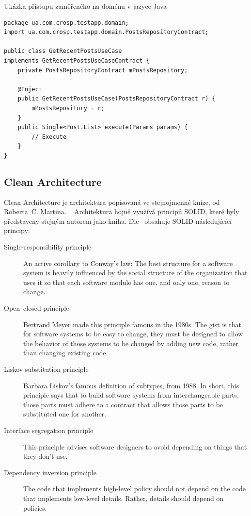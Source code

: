 \begin{listing}
    \caption{Ukázka přístupu zaměřeného na doménu v jazyce Java~\cite{architecture}}
    \label{code:architecture-domain}
    \begin{verbatim}
package ua.com.crosp.testapp.domain;
import ua.com.crosp.testapp.domain.PostsRepositoryContract;

public class GetRecentPostsUseCase
implements GetRecentPostsUseCaseContract {
    private PostsRepositoryContract mPostsRepository;

    @Inject
    public GetRecentPostsUseCase(PostsRepositoryContract r) {
        mPostsRepository = r;
    }
    public Single<Post.List> execute(Params params) {
        // Execute
    }
}
    \end{verbatim}
\end{listing}

\subsection{Clean Architecture}

Clean Architecture je architektura popisovaná ve stejnojmenné knize,
od Roberta~C. Martina.
\emph{}~\cite[strana~57]{martin_clean_architecture}
Architektura hojně využívá principů SOLID,
které byly představeny stejným autorem jako kniha.
Dle~\cite[strana~57--59]{martin_clean_architecture} obsahuje SOLID následujícící
principy:

\begin{description}
    \item[Single-responsibility principle] An active corollary to Conway’s law:
    The best structure for a software system is heavily influenced
    by the social structure of the organization that uses it so that
    each software module has one, and only one, reason to change.
    \item[Open--closed principle] Bertrand Meyer made this principle famous
    in the 1980s.
    The gist is that for software systems to be easy to change,
    they must be designed to allow the behavior of those systems to be changed
    by adding new code,
    rather than changing existing code.
    \item[Liskov substitution principle] Barbara Liskov’s famous definition of
    subtypes, from 1988.
    In short, this principle says that to build software systems from
    interchangeable parts,
    those parts must adhere to a contract that allows those parts to be
    substituted one for another.
    \item[Interface segregation principle] This principle advises software
    designers to avoid depending on things that they don’t use.
    \item[Dependency inversion principle] The code that implements high-level
    policy should not depend on the code that implements low-level details.
    Rather, details should depend on policies.
\end{description}

